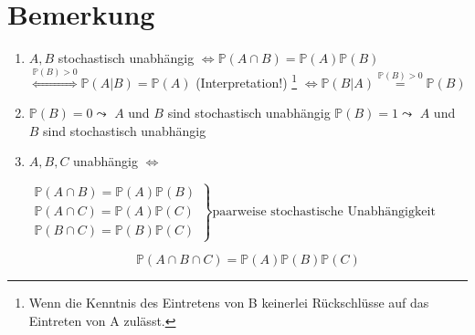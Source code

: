 \documentclass[a4paper,11pt,notitlepage]{report}
\newcommand{\Prim}{{\ensuremath{\mathbb{P}}}}
\begin{document}
\section{Bemerkung}
\begin{enumerate}
	\item $A,B$ stochastisch unabhängig \newline
	$\Leftrightarrow \Prim(A \cap B) = \Prim(A)\Prim(B)$ \newline
	$\overset{\Prim(B)>0}{\Leftrightarrow} \Prim(A|B) = \Prim(A)$ (Interpretation!)
	\footnote{Wenn die Kenntnis des Eintretens von B keinerlei Rückschlüsse auf das Eintreten von A zulässt.} \newline
	$\Leftrightarrow \Prim(B|A) \overset{\Prim(B)>0}{=} \Prim(B)$
	
	\item $\Prim(B) = 0 \leadsto$ $A$ und $B$ sind stochastisch unabhängig \newline
		$\Prim(B) = 1 \leadsto$ $A$ und $B$ sind stochastisch unabhängig
		
	\item $A,B,C$ unabhängig $\Leftrightarrow$
		
		$\left.
\begin{array}{cc} %
\Prim(A \cap B) = \Prim(A)\Prim(B)
 \\ \Prim(A \cap C) = \Prim(A)\Prim(C) 
 \\ \Prim(B \cap C) = \Prim(B)\Prim(C) 
\end{array}
\right\}
\text{paarweise stochastische Unabhängigkeit}
$
		
		$$\Prim(A \cap B \cap C) = \Prim(A) \Prim(B) \Prim(C)$$
\end{enumerate}
\end{document}
